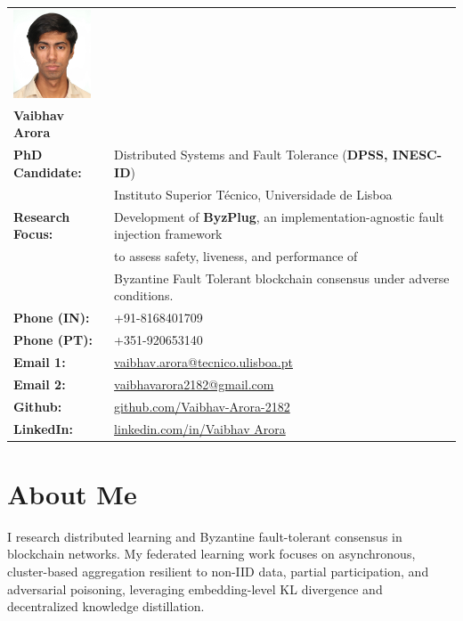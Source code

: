 \documentclass[a4paper,11pt]{article}
\makeatletter
\newcommand{\name}{Vaibhav Arora} %
\newcommand{\phone}{8168401709} %
\newcommand{\phonee}{920653140} %
\newcommand{\emaila}{vaibhav.arora@tecnico.ulisboa.pt} %
\newcommand{\emailb}{vaibhavarora2182@gmail.com} %
\newcommand{\github}{Vaibhav-Arora-2182} %
\newcommand{\linkedin}{Vaibhav Arora} %
\makeatother
\begin{document}
\selectfont
\begin{tabular}{@{} l l @{}}
\includegraphics[width=2.3cm,clip]{22.jpg} & \\[0.3em]

\textbf{\LARGE \name} & \\[0.3em]

\textbf{PhD Candidate:} & Distributed Systems and Fault Tolerance (\textbf{DPSS, INESC-ID}) \\
& Instituto Superior Técnico, Universidade de Lisboa \\
\textbf{Research Focus:} & Development of \textbf{ByzPlug}, an implementation-agnostic fault injection framework \\
& to assess safety, liveness, and performance of \\
& Byzantine Fault Tolerant blockchain consensus under adverse conditions. \\



\textbf{Phone (IN):} & +91-\phone \\

\textbf{Phone (PT):} & +351-\phonee \\

\textbf{Email 1:} & \href{mailto:\emaila}{\emaila} \\

\textbf{Email 2:} & \href{mailto:\emailb}{\emailb} \\[0.3em]

\textbf{Github:} & \href{https://github.com/Vaibhav-Arora-2182\github}{github.com/Vaibhav-Arora-2182} \\

\textbf{LinkedIn:} & \href{https://www.linkedin.com/in/vaibhav-arora-a0929b18a/\linkedin/}{linkedin.com/in/\linkedin} \\
\end{tabular}



\section*{About Me}

I research distributed learning and Byzantine fault-tolerant consensus in blockchain networks. My federated learning work focuses on asynchronous, cluster-based aggregation resilient to non-IID data, partial participation, and adversarial poisoning, leveraging embedding-level KL divergence and decentralized knowledge distillation.
\end{document}
